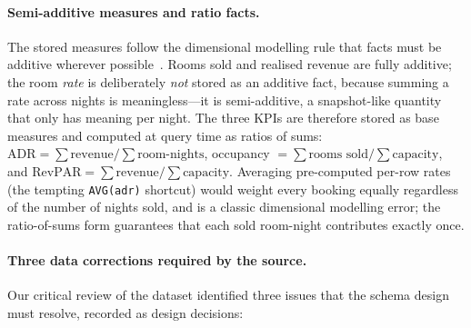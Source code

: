 \paragraph{Semi-additive measures and ratio facts.}
The stored measures follow the dimensional modelling rule that facts must be additive wherever possible~\cite{kimball2013}. Rooms sold and realised revenue are fully additive; the room \emph{rate} is deliberately \emph{not} stored as an additive fact, because summing a rate across nights is meaningless---it is semi-additive, a snapshot-like quantity that only has meaning per night. The three KPIs are therefore stored as base measures and computed at query time as ratios of sums: $\text{ADR} = \sum \text{revenue} / \sum \text{room-nights}$, occupancy $= \sum \text{rooms sold} / \sum \text{capacity}$, and $\text{RevPAR} = \sum \text{revenue} / \sum \text{capacity}$. Averaging pre-computed per-row rates (the tempting \texttt{AVG(adr)} shortcut) would weight every booking equally regardless of the number of nights sold, and is a classic dimensional modelling error; the ratio-of-sums form guarantees that each sold room-night contributes exactly once.

\paragraph{Three data corrections required by the source.}
Our critical review of the dataset identified three issues that the schema design must resolve, recorded as design decisions:

